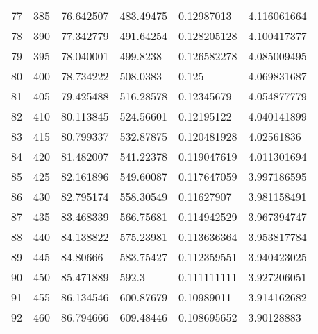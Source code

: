 \documentclass[../Matt_Gebert_Honours_Thesis.tex]{subfiles}
\begin{document}
\begin{longtable}[c]{l|lllll}
	77  & 385                     & 76.642507               & 483.49475 & 0.12987013              & 4.116061664            \\
	78  & 390                     & 77.342779               & 491.64254 & 0.128205128             & 4.100417377            \\
	79  & 395                     & 78.040001               & 499.8238  & 0.126582278             & 4.085009495            \\
	80  & 400                     & 78.734222               & 508.0383  & 0.125                   & 4.069831687            \\
	81  & 405                     & 79.425488               & 516.28578 & 0.12345679              & 4.054877779            \\
	82  & 410                     & 80.113845               & 524.56601 & 0.12195122              & 4.040141899            \\
	83  & 415                     & 80.799337               & 532.87875 & 0.120481928             & 4.02561836             \\
	84  & 420                     & 81.482007               & 541.22378 & 0.119047619             & 4.011301694            \\
	85  & 425                     & 82.161896               & 549.60087 & 0.117647059             & 3.997186595            \\
	86  & 430                     & 82.795174               & 558.30549 & 0.11627907              & 3.981158491            \\
	87  & 435                     & 83.468339               & 566.75681 & 0.114942529             & 3.967394747            \\
	88  & 440                     & 84.138822               & 575.23981 & 0.113636364             & 3.953817784            \\
	89  & 445                     & 84.80666                & 583.75427 & 0.112359551             & 3.940423025            \\
	90  & 450                     & 85.471889               & 592.3     & 0.111111111             & 3.927206051            \\
	91  & 455                     & 86.134546               & 600.87679 & 0.10989011              & 3.914162682            \\
	92  & 460                     & 86.794666               & 609.48446 & 0.108695652             & 3.90128883             \\

\end{longtable}
\end{document}

